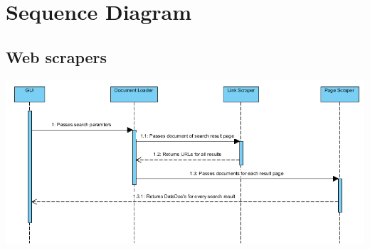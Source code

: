 \documentclass[12pt]{article}
\begin{document}
\section{Sequence Diagram}
\subsection{Web scrapers}
\includegraphics[scale=0.75]{ScrpSecDiag.PNG}
\end{document}
